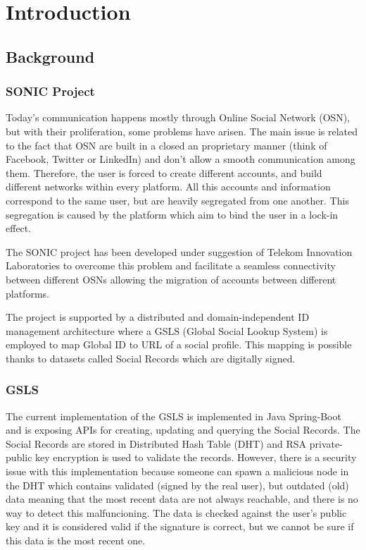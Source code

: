 \chapter{Introduction}
\label{introduction}

\section{Background}

\subsection{SONIC Project}
Today’s communication happens mostly through Online Social Network (OSN), but with their proliferation, some problems have arisen. The main issue is related to the fact that OSN are built in a closed an proprietary manner (think of Facebook, Twitter or LinkedIn) and don’t allow a smooth  communication among them. Therefore, the user is forced to create different accounts, and build different networks within every platform. All this accounts and information correspond to the same user, but are heavily segregated from one another. This segregation is caused by the platform which aim to bind the user in a lock-in effect.


The SONIC project has been developed under suggestion of Telekom Innovation Laboratories to overcome this problem and facilitate a seamless connectivity between different OSNs \citep{gondor2014sonic} allowing the migration of accounts between different platforms.

The project is supported by a distributed and domain-independent ID management architecture where a GSLS (Global Social Lookup System) is employed to map Global ID to URL of a social profile. This mapping is possible thanks to datasets called Social Records which are digitally signed.

\subsection {GSLS}
The current implementation of the GSLS is implemented in Java Spring-Boot and is exposing APIs for creating, updating and  querying the Social Records. The Social Records are stored in  Distributed Hash Table (DHT) and RSA private-public key encryption is used to validate the records. However, there is a security issue with this implementation because someone can spawn a malicious node in the DHT which contains validated (signed by the real user), but outdated (old) data meaning that the most recent data are not always reachable, and there is no way to detect this malfuncioning. The data is checked against the user’s public key and it is considered valid if the signature is correct, but we cannot be sure if this data is the most recent one.

